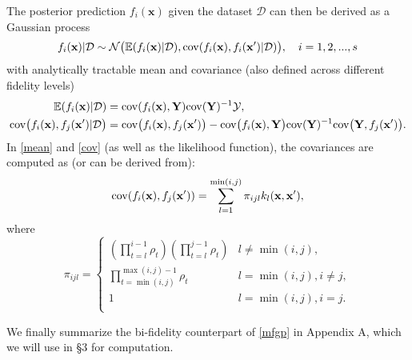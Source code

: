 \documentclass[11pt]{article}
\begin{document}
The posterior prediction $f_i(\mathbf{x})$ given the dataset $\mathcal{D}$ can then be derived as a Gaussian process
\begin{equation}
    f_{i}(\mathbf{x})|\mathcal{D} \sim \mathcal{N}\big(\mathbb{E}(f_i(\mathbf{x})|\mathcal{D}), {\rm{cov}}(f_i(\mathbf{x}), f_i(\mathbf{x}')|\mathcal{D}) \big), \quad i=1,2,...,s
\label{mfgp}
\end{equation}
with analytically tractable mean and covariance (also defined across different fidelity levels)
\begin{align}
    \mathbb{E}(f_i(\mathbf{x})|\mathcal{D})  & = {\rm{cov}}(f_i(\mathbf{x}), \mathbf{Y}) {\rm{cov}}(\mathbf{Y})^{-1} \mathcal{Y},
\label{mean} \\  
    {\rm{cov}}\big(f_i(\mathbf{x}), f_j(\mathbf{x}') |\mathcal{D} \big) & = {\rm{cov}}\big(f_i(\mathbf{x}), f_j(\mathbf{x}')\big) - {\rm{cov}}\big(f_i(\mathbf{x}), \mathbf{Y} \big) {\rm{cov}}(\mathbf{Y})^{-1} {\rm{cov}}\big( \mathbf{Y}, f_j(\mathbf{x}') \big).
\label{cov}
\end{align}
In \eqref{mean} and \eqref{cov} (as well as the likelihood function), the covariances are computed as (or can be derived from):
\begin{equation}
     {\rm{cov}}(f_i(\mathbf{x}), f_j(\mathbf{x}')) 
    = \sum_{l=1}^{\min(i,j)} \pi_{ijl} k_l(\mathbf{x}, \mathbf{x}'),
\label{tf_cov_prior}
\end{equation}
where
\begin{equation}
\pi_{ijl}= \left\{
\begin{array}{ll}
      (\prod_{t=l}^{i-1} \rho_t) (\prod_{t=l}^{j-1} \rho_t) & l  \neq \min(i,j), \\
      \prod_{t=\min(i,j)}^{\max(i,j)-1} \rho_t &  l = \min(i,j), i \neq j, \\
      1 & l = \min(i,j), i=j. \\
\end{array} 
\right.
\end{equation}

We finally summarize the bi-fidelity counterpart of \eqref{mfgp} in Appendix A, which we will use in \S 3 for computation.
\end{document}
